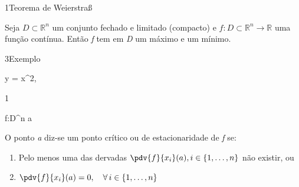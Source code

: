 \documentclass[\mainfilename]{subfiles}
\begin{document}
\begin{definitionBox}1{Teorema de Weierstraß} %
    
    Seja \(D\subset\mathbb{R}^n\) um conjunto fechado e limitado (compacto) e \(f:D\subset\mathbb{R}^n\to\mathbb{R}\) uma função contínua. Então \textit{f} tem em \textit{D} um máximo e um mínimo.

    \begin{definitionBox}3{Exemplo} %
        
        \begin{BM}
            y = x^2,\ 
        \end{BM}

    \tikzset{external/remake next=true}
    \begin{center}
        \pgfplotsset{
            height=4cm, 
            width =10cm}
    \end{center}
        
    \end{definitionBox}
    
\end{definitionBox}

\begin{definitionBox}1{} %
    
    \begin{BM}
        f:D\subset{}^n\to {}
        \quad
        a\in{}
    \end{BM}
    O ponto \textit{a} diz-se um ponto crítico ou de estacionaridade de \textit{f} se:
    \begin{enumerate}
        \item Pelo menos uma das dervadas \(\pdv{f}{x_i}(a),i\in\{1,\dots,n\}\) não existir, ou
        \item \(\pdv{f}{x_i}(a)= 0,\quad\forall\,i\in\{1,\dots,n\}\)
    \end{enumerate}
    
\end{definitionBox}
\end{document}
